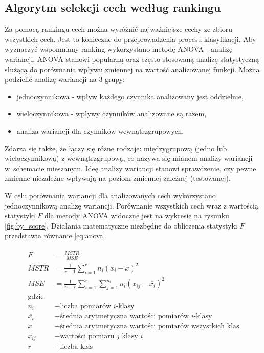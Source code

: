 \clearpage
\subsection{Algorytm selekcji cech według rankingu}
Za pomocą rankingu cech można wyróżnić najważniejsze cechy ze zbioru wszystkich cech. Jest to konieczne do przeprowadzenia procesu klasyfikacji. Aby wyznaczyć wspomniany ranking wykorzystano metodę ANOVA\cite{anova} - analizę wariancji. ANOVA stanowi popularną oraz często stosowaną analizę statystyczną służącą do porównania wpływu zmiennej na wartość analizowanej funkcji. Można podzielić analizę wariancji na 3 grupy:

\begin{itemize}
    \item jednoczynnikowa - wpływ każdego czynnika analizowany jest oddzielnie,
    \item wieloczynnikowa - wpływy czynników analizowane są razem,
    \item analiza wariancji dla czynników wewnątrzgrupowych.
\end{itemize}

Zdarza się także, że łączy się różne rodzaje: międzygrupową (jedno lub wieloczynnikową) z wewnątrzgrupową, co nazywa się mianem analizy wariancji w~schemacie mieszanym. Ideę analizy wariancji stanowi sprawdzenie, czy pewne zmienne niezależne wpływają na poziom zmiennej zależnej (testowanej).

W celu porównania wariancji dla analizowanych cech wykorzystano jednoczynnikową analizę wariancji. Porównanie wszystkich cech wraz z wartością statystyki $F$ dla metody ANOVA widoczne jest na wykresie na rysunku \ref{fig:by_score}. Działania matematyczne niezbędne do obliczenia statystyki $F$ przedstawia równanie \ref{eq:anova}.

\begin{align}\label{eq:anova}
    \begin{split}
        F              & = \frac{MSTR}{MSE}                                                         \\
        MSTR           & = \frac{1}{r-1} \sum_{i=1}^r n_i(\overline{x_i}-\overline{x})^2            \\
        MSE            & = \frac{1}{n-r} \sum_{i=1}^r \sum_{j=1}^{n_i} n_i(x_{ij}-\overline{x_i})^2 \\
        \text{gdzie:}                                                                               \\
        n_i            & - \text{liczba pomiarów $i$-klasy}                                         \\
        \overline{x_i} & - \text{średnia arytmetyczna wartości pomiarów $i$-klasy}                  \\
        \overline{x}   & - \text{średnia arytmetyczna wartości pomiarów wszystkich klas}            \\
        x_{ij}   & - \text{wartości pomiaru $j$ klasy $i$}            \\
        r              & - \text{liczba klas}
    \end{split}
\end{align}

